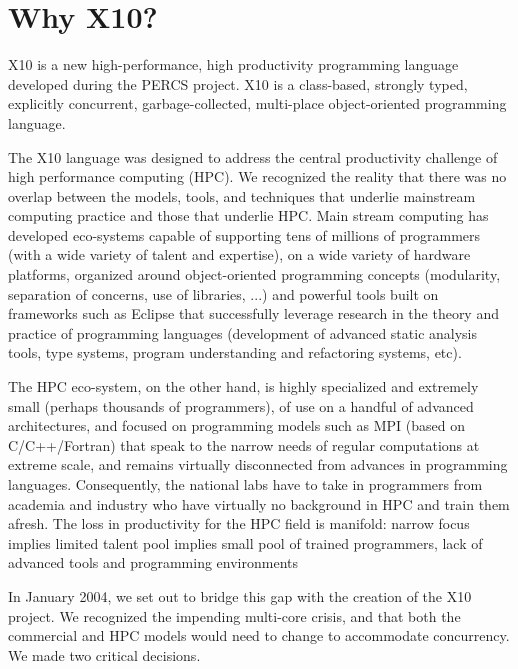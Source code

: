 \chapter{Why X10?}\label{chap:whyx10}


X10 is a new high-performance, high productivity programming language
developed during the PERCS project. X10 is a class-based, strongly
typed, explicitly concurrent, garbage-collected, multi-place
object-oriented programming language.  

The X10 language was designed to address the central productivity
challenge of high performance computing (HPC). We recognized the
reality that there was no overlap between the models, tools, and
techniques that underlie mainstream computing practice and those that
underlie HPC. Main stream computing has developed eco-systems capable
of supporting tens of millions of programmers (with a wide variety of
talent and expertise), on a wide variety of hardware platforms,
organized around object-oriented programming concepts (modularity,
separation of concerns, use of libraries, ...) and powerful tools
built on frameworks such as Eclipse that successfully leverage
research in the theory and practice of programming languages
(development of advanced static analysis tools, type systems, program
understanding and refactoring systems, etc).  

The HPC eco-system, on the other hand, is highly specialized and
extremely small (perhaps thousands of programmers), of use on a
handful of advanced architectures, and focused on programming models
such as MPI (based on C/C++/Fortran) that speak to the narrow needs of
regular computations at extreme scale, and remains virtually
disconnected from advances in programming languages. Consequently, the
national labs have to take in programmers from academia and industry
who have virtually no background in HPC and train them afresh. The
loss in productivity for the HPC field is manifold: narrow focus
implies limited talent pool implies  small pool of trained
programmers, lack of advanced tools and programming  environments

In January 2004, we set out to bridge this gap with the creation of
the X10 project. We recognized the impending multi-core crisis, and
that both the commercial and HPC models would need to change to
accommodate concurrency. We made two critical decisions.  

